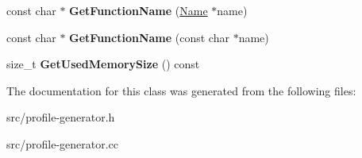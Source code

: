 \begin{DoxyCompactItemize}
\item 
\hypertarget{classv8_1_1internal_1_1_strings_storage_a4e8c15f94d933f1d61c5185d377f48e7}{}const char $\ast$ {\bfseries Get\+Function\+Name} (\hyperlink{classv8_1_1internal_1_1_name}{Name} $\ast$name)\label{classv8_1_1internal_1_1_strings_storage_a4e8c15f94d933f1d61c5185d377f48e7}

\item 
\hypertarget{classv8_1_1internal_1_1_strings_storage_ade4bb391fe20b2c09190ab1489c1d7e4}{}const char $\ast$ {\bfseries Get\+Function\+Name} (const char $\ast$name)\label{classv8_1_1internal_1_1_strings_storage_ade4bb391fe20b2c09190ab1489c1d7e4}

\item 
\hypertarget{classv8_1_1internal_1_1_strings_storage_a54dd75cdb8c7868cc6ebee2301e99a50}{}size\+\_\+t {\bfseries Get\+Used\+Memory\+Size} () const \label{classv8_1_1internal_1_1_strings_storage_a54dd75cdb8c7868cc6ebee2301e99a50}

\end{DoxyCompactItemize}


The documentation for this class was generated from the following files\+:\begin{DoxyCompactItemize}
\item 
src/profile-\/generator.\+h\item 
src/profile-\/generator.\+cc\end{DoxyCompactItemize}
